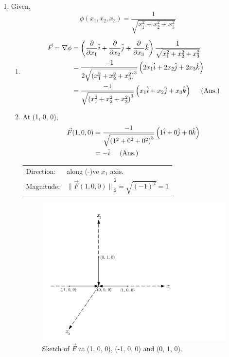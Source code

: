 \documentclass[11pt]{article} %
\begin{document}
\begin{enumerate}
\renewcommand{\labelenumi}{\bfseries\theenumi.}
\item Given, 
\begin{equation*}
\phi(x_1, x_2, x_3) = \frac{1}{\sqrt{x_1^2+x_2^2+x_3^2}}
\end{equation*}
\begin{enumerate}[\textbf{(\alph*)}]
\renewcommand{\labelenumi}{\bfseries\theenumi.}
\item
\begin{equation*}
\begin{split}
\Vec F = \nabla\phi &= \left(\frac{\partial}{\partial {x_1}}\hat i + \frac{\partial}{\partial {x_2}}\hat j + \frac{\partial}{\partial {x_3}}\hat k\right)\frac{1}{\sqrt{x_1^2+x_2^2+x_3^2}}\\
&=\frac{-1}{2\sqrt{{\left(x_1^2+x_2^2+x_3^2\right)}^3}}\left(2x_1\hat i  + 2x_2\hat j  + 2x_3\hat k \right)\\
&=\frac{-1}{\sqrt{{\left(x_1^2+x_2^2+x_3^2\right)}^3}}\left(x_1\hat i  + x_2\hat j  + x_3\hat k \right) \hspace{0.5cm} \text{(Ans.)}
\end{split}
\end{equation*}
\item
At (1, 0, 0),
\begin{equation*}
\begin{split}
\Vec F (1, 0, 0) &=\frac{-1}{\sqrt{{\left(1^2+0^2+0^2\right)}^3}}\left(1\hat i  + 0\hat j  + 0\hat k \right) \\
&= -\hat i \hspace{0.5cm} \text{(Ans.)}
\end{split}
\end{equation*}
\begin{tabular}{ll}
Direction: &along (-)ve $x_1$ axis. \\
Magnitude:  &${\| \Vec F (1, 0, 0) \|}_2^2 = \sqrt{{\left(-1\right)}^2} = 1$
\end{tabular}
\begin{figure}[!htb]
    \centering
        \includegraphics[width=10cm,trim={1cm 0cm 8cm 1cm},clip]{vector}
    \caption{Sketch of $\Vec F$ at (1, 0, 0), (-1, 0, 0) and (0, 1, 0).}
    \label{fig1}
\end{figure}


\end{enumerate}
\end{enumerate}
\end{document}
